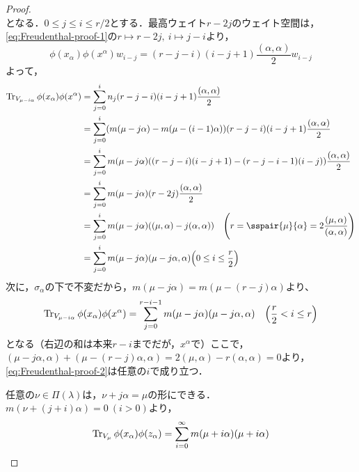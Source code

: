 \documentclass[rep_main]{subfiles}
\begin{document}
\begin{proof}
\begin{equation}
	\end{equation}
	となる．$0 \leq j \leq i \leq r/2$とする．最高ウェイト$r - 2j$のウェイト空間は，\eqref{eq:Freudenthal-proof-1}の$r \mapsto r - 2j,\ i \mapsto j - i$より，
	\begin{equation}
		\phi(x_\alpha)\phi(x^\alpha)w_{i - j} = (r - j - i)(i - j + 1)\frac{(\alpha, \alpha)}{2}w_{i - j}
	\end{equation}
	よって，
	\begin{align}
		\Tr_{V_{\mu - i\alpha}} \phi(x_\alpha)\phi(x^\alpha) &= \sum_{j = 0}^i n_j(r - j - i)(i - j + 1)\frac{(\alpha, \alpha)}{2} \\
		&= \sum_{j = 0}^i (m(\mu - j\alpha) - m(\mu - (i - 1)\alpha))(r - j - i)(i - j + 1)\frac{(\alpha, \alpha)}{2} \\
		&= \sum_{j = 0}^i m(\mu - j\alpha)((r - j - i)(i - j + 1) - (r - j - i - 1)(i - j))\frac{(\alpha, \alpha)}{2} \\
		&= \sum_{j = 0}^i m(\mu - j\alpha)(r - 2j)\frac{(\alpha, \alpha)}{2} \\
		&= \sum_{j = 0}^i m(\mu - j\alpha)((\mu, \alpha) - j(\alpha, \alpha))\quad  \Biggl(r = \sspair{\mu}{\alpha} = 2\frac{(\mu, \alpha)}{(\alpha, \alpha)}\Biggr) \\
		\label{eq:Freudenthal-proof-2}
		&= \sum_{j=0}^i m(\mu - j\alpha)(\mu - j\alpha, \alpha)  \Bigl(0 \leq i \leq \frac{r}{2}\Bigr)
	\end{align}
	次に，$\sigma_\alpha$の下で不変だから，$m(\mu - j\alpha) = m(\mu - (r - j)\alpha)$より、
	\begin{equation}
		\Tr_{V_{\mu - i\alpha}} \phi(x_\alpha)\phi(x^\alpha) = \sum_{j=0}^{r - i - 1} m(\mu - j\alpha)(\mu - j\alpha, \alpha)\quad  \Bigl(\frac{r}{2} < i \leq r\Bigr)
	\end{equation}
	となる（右辺の和は本来$r - i$までだが，$x^\alpha$で）ここで，$(\mu - j\alpha, \alpha) + (\mu - (r-j)\alpha, \alpha) = 2(\mu, \alpha) - r(\alpha, \alpha) = 0$より，\ref{eq:Freudenthal-proof-2}は任意の$i$で成り立つ．
	
	任意の$\nu \in \Pi(\lambda)$は，$\nu + j\alpha = \mu$の形にできる．$m(\nu + (j + i)\alpha) = 0\ (i > 0)$より，
	\begin{equation}
		\Tr_{V_\mu} \phi(x_\alpha)\phi(z_\alpha) = \sum_{i=0}^\infty m(\mu + i\alpha)(\mu + i\alpha)
	\end{equation}
	

\end{proof}
\end{document}
